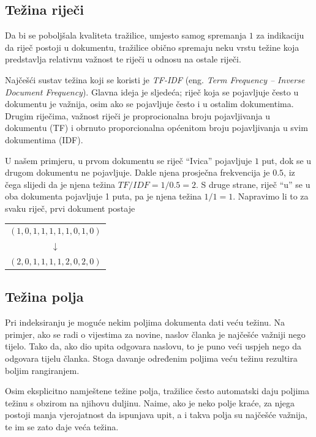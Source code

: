 \documentclass[a4paper,twoside,12pt]{scrreprt}
\newenvironment{nscenter}
 {\par\nopagebreak\centering}
 {\parskip=0pt\par\noindent\ignorespacesafterend}
\begin{document}
\subsection{Težina riječi}
\label{tfidf}

Da bi se poboljšala kvaliteta tražilice, umjesto samog spremanja $1$ za indikaciju da riječ postoji u dokumentu, tražilice obično spremaju neku vrstu težine koja predstavlja relativnu važnost te riječi u odnosu na ostale riječi.

Najčešći sustav težina koji se koristi je \textit{TF-IDF} (eng. \textit{Term Frequency – Inverse Document Frequency}). Glavna ideja je sljedeća; riječ koja se pojavljuje često u dokumentu je važnija, osim ako se pojavljuje često i u ostalim dokumentima. Drugim riječima, važnost riječi je proprocionalna broju pojavljivanja u dokumentu (TF) i obrnuto proporcionalna općenitom broju pojavljivanja u svim dokumentima (IDF).

U našem primjeru, u prvom dokumentu se riječ ``Ivica'' pojavljuje $1$ put, dok se u drugom dokumentu ne pojavljuje. Dakle njena prosječna frekvencija je $0.5$, iz čega slijedi da je njena težina $TF / IDF = 1 / 0.5 = 2$. S druge strane, riječ ``u'' se u oba dokumenta pojavljuje 1 puta, pa je njena težina $1 / 1 = 1$. Napravimo li to za svaku riječ, prvi dokument postaje

\begin{nscenter}
  \begin{tabular}{c}
    $(1,0,1,1,1,1,1,0,1,0)$ \\
    $\downarrow$            \\
    $(2,0,1,1,1,1,2,0,2,0)$ \\
  \end{tabular}
\end{nscenter}

\subsection{Težina polja}

Pri indeksiranju je moguće nekim poljima dokumenta dati veću težinu. Na primjer, ako se radi o vijestima za novine, naslov članka je najčešće važniji nego tijelo. Tako da, ako dio upita odgovara naslovu, to je puno veći uspjeh nego da odgovara tijelu članka. Stoga davanje određenim poljima veću težinu rezultira boljim rangiranjem.

Osim eksplicitno namještene težine polja, tražilice često automatski daju poljima težinu s obzirom na njihovu duljinu. Naime, ako je neko polje kraće, za njega postoji manja vjerojatnost da ispunjava upit, a i takva polja su najčešće važnija, te im se zato daje veća težina.
\end{document}
